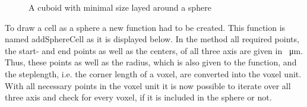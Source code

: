 \begin{figure}
\begin{center}
\caption{A cuboid with minimal size layed around a sphere}
\label{tikz:CuboidSphere}
\end{center}
\end{figure}

To draw a cell as a sphere a new function had to be created. This function is named addSphereCell as it is displayed below. In the method all required points, the start- and end points as well as the centers, of all three axis are given in \SI{}{\micro\metre}. Thus, these points as well as the radius, which is also given to the function, and the steplength, i.e. the corner length of a voxel, are converted into the voxel unit. \newline
With all necessary points in the voxel unit it is now possible to iterate over all three axis and check for every voxel, if it is included in the sphere or not.



